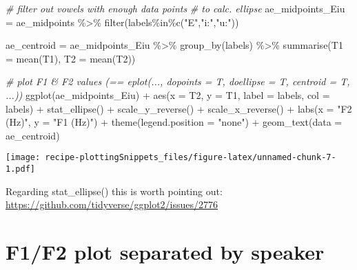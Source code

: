 \documentclass[
]{book}
\newenvironment{Shaded}{\begin{snugshade}}{\end{snugshade}}
\newcommand{\AttributeTok}[1]{\textcolor[rgb]{0.77,0.63,0.00}{#1}}
\newcommand{\CommentTok}[1]{\textcolor[rgb]{0.56,0.35,0.01}{\textit{#1}}}
\newcommand{\FunctionTok}[1]{\textcolor[rgb]{0.00,0.00,0.00}{#1}}
\newcommand{\NormalTok}[1]{#1}
\newcommand{\OtherTok}[1]{\textcolor[rgb]{0.56,0.35,0.01}{#1}}
\newcommand{\SpecialCharTok}[1]{\textcolor[rgb]{0.00,0.00,0.00}{#1}}
\newcommand{\StringTok}[1]{\textcolor[rgb]{0.31,0.60,0.02}{#1}}
\begin{document}
\begin{Shaded}
\begin{Highlighting}[]
\CommentTok{\# filter out vowels with enough data points }
\CommentTok{\# to calc. ellipse}
\NormalTok{ae\_midpoints\_Eiu }\OtherTok{=}\NormalTok{ ae\_midpoints }\SpecialCharTok{\%\textgreater{}\%} \FunctionTok{filter}\NormalTok{(labels}\SpecialCharTok{\%in\%}\FunctionTok{c}\NormalTok{(}\StringTok{"E"}\NormalTok{,}\StringTok{"i:"}\NormalTok{,}\StringTok{"u:"}\NormalTok{))}

\NormalTok{ae\_centroid }\OtherTok{=}\NormalTok{ ae\_midpoints\_Eiu }\SpecialCharTok{\%\textgreater{}\%}
  \FunctionTok{group\_by}\NormalTok{(labels) }\SpecialCharTok{\%\textgreater{}\%}
  \FunctionTok{summarise}\NormalTok{(}\AttributeTok{T1 =} \FunctionTok{mean}\NormalTok{(T1), }\AttributeTok{T2 =} \FunctionTok{mean}\NormalTok{(T2))}

\CommentTok{\# plot F1 \& F2 values (== eplot(..., dopoints = T, doellipse = T, centroid = T, ...))}
\FunctionTok{ggplot}\NormalTok{(ae\_midpoints\_Eiu) }\SpecialCharTok{+}
  \FunctionTok{aes}\NormalTok{(}\AttributeTok{x =}\NormalTok{ T2, }\AttributeTok{y =}\NormalTok{ T1, }\AttributeTok{label =}\NormalTok{ labels, }\AttributeTok{col =}\NormalTok{ labels) }\SpecialCharTok{+}
  \FunctionTok{stat\_ellipse}\NormalTok{() }\SpecialCharTok{+}
  \FunctionTok{scale\_y\_reverse}\NormalTok{() }\SpecialCharTok{+} \FunctionTok{scale\_x\_reverse}\NormalTok{() }\SpecialCharTok{+} 
  \FunctionTok{labs}\NormalTok{(}\AttributeTok{x =} \StringTok{"F2 (Hz)"}\NormalTok{, }\AttributeTok{y =} \StringTok{"F1 (Hz)"}\NormalTok{) }\SpecialCharTok{+}
  \FunctionTok{theme}\NormalTok{(}\AttributeTok{legend.position =} \StringTok{"none"}\NormalTok{) }\SpecialCharTok{+}
  \FunctionTok{geom\_text}\NormalTok{(}\AttributeTok{data =}\NormalTok{ ae\_centroid)}
\end{Highlighting}
\end{Shaded}

\texttt{[image: recipe-plottingSnippets\_files/figure-latex/unnamed-chunk-7-1.pdf]}

Regarding stat\_ellipse() this is worth pointing out: \url{https://github.com/tidyverse/ggplot2/issues/2776}

\hypertarget{f1f2-plot-separated-by-speaker}{%
\section{F1/F2 plot separated by speaker}\label{f1f2-plot-separated-by-speaker}}
\end{document}
